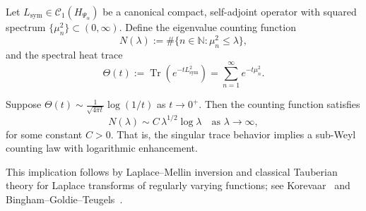 \begin{lemma}
\label{lem:tauberian_heat_trace_application}
Let \( L_{\mathrm{sym}} \in \mathcal{C}_1(H_{\Psi_\alpha}) \) be a canonical compact, self-adjoint operator with squared spectrum \( \{ \mu_n^2 \} \subset (0, \infty) \). Define the eigenvalue counting function
\[
N(\lambda) := \#\{ n \in \mathbb{N} : \mu_n^2 \le \lambda \},
\]
and the spectral heat trace
\[
\Theta(t) := \operatorname{Tr}(e^{-t L_{\mathrm{sym}}^2}) = \sum_{n=1}^\infty e^{-t \mu_n^2}.
\]

\medskip
\noindent
Suppose \( \Theta(t) \sim \frac{1}{\sqrt{4\pi t}} \log(1/t) \) as \( t \to 0^+ \). Then the counting function satisfies
\[
N(\lambda) \sim C \, \lambda^{1/2} \log \lambda \quad \text{as } \lambda \to \infty,
\]
for some constant \( C > 0 \). That is, the singular trace behavior implies a sub-Weyl counting law with logarithmic enhancement.

\medskip
\noindent
This implication follows by Laplace–Mellin inversion and classical Tauberian theory for Laplace transforms of regularly varying functions; see Korevaar~\cite[Thm.~4.12.9]{Korevaar2004Tauberian} and Bingham–Goldie–Teugels~\cite[Thm.~1.7.1]{BGT1989RegularVariation}.
\end{lemma}
